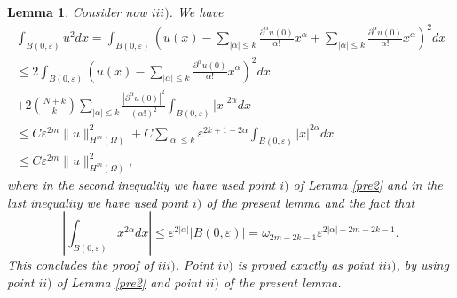 \documentclass[11pt,a4paper]{amsart}
\numberwithin{equation}{section}
\newtheorem{lemma}[equation]{Lemma}
\begin{document}
\begin{lemma}
Consider now $iii)$. We have
\begin{multline*}
\int_{B(0,\varepsilon)}u^2dx=\int_{B(0,\varepsilon)}\left(u(x)-\sum_{|\alpha|\leq k}\frac{\partial^{\alpha}u(0)}{\alpha !}x^{\alpha}+\sum_{|\alpha|\leq k}\frac{\partial^{\alpha}u(0)}{\alpha !}x^{\alpha}\right)^2dx\\
\leq 2 \int_{B(0,\varepsilon)}\left(u(x)-\sum_{|\alpha|\leq k}\frac{\partial^{\alpha}u(0)}{\alpha !}x^{\alpha}\right)^2dx\\
+2\binom{N+k}{k}\sum_{|\alpha|\leq k}\frac{|\partial^{\alpha}u(0)|^2}{(\alpha !)^2}\int_{B(0,\varepsilon)}|x|^{2\alpha}dx\\
\leq C\varepsilon^{2m}\|u\|_{H^m(\Omega)}^2+C\sum_{|\alpha|\leq k}\varepsilon^{2k+1-2\alpha}\int_{B(0,\varepsilon)}|x|^{2\alpha}dx\\
\leq C\varepsilon^{2m}\|u\|_{H^m(\Omega)}^2,
\end{multline*}
where in the second inequality we have used point $i)$ of Lemma \ref{pre2} and in the last inequality we have used point $i)$ of the present lemma and the fact that
$$
\left|\int_{B(0,\varepsilon)}x^{2\alpha}dx\right|\leq\varepsilon^{2|\alpha|}|B(0,\varepsilon)|=\omega_{2m-2k-1}\varepsilon^{2|\alpha|+2m-2k-1}.
$$
This concludes the proof of $iii)$. Point $iv)$ is proved exactly as point $iii)$, by using point $ii)$ of Lemma \ref{pre2} and point $ii)$ of the present lemma.


\end{lemma}
\end{document}
